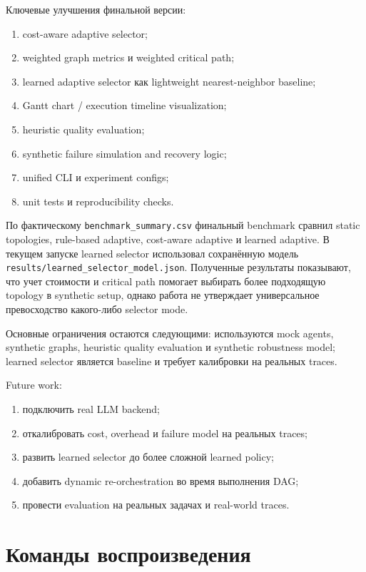 \documentclass[12pt,a4paper]{report}
\newcommand{\code}[1]{\texttt{#1}}
\begin{document}
Ключевые улучшения финальной версии:
\begin{enumerate}
  \item cost-aware adaptive selector;
  \item weighted graph metrics и weighted critical path;
  \item learned adaptive selector как lightweight nearest-neighbor baseline;
  \item Gantt chart / execution timeline visualization;
  \item heuristic quality evaluation;
  \item synthetic failure simulation and recovery logic;
  \item unified CLI и experiment configs;
  \item unit tests и reproducibility checks.
\end{enumerate}

По фактическому \code{benchmark\_summary.csv} финальный benchmark сравнил static topologies, rule-based adaptive, cost-aware adaptive и learned adaptive. В текущем запуске learned selector использовал сохранённую модель \code{results/learned\_selector\_model.json}. Полученные результаты показывают, что учет стоимости и critical path помогает выбирать более подходящую topology в synthetic setup, однако работа не утверждает универсальное превосходство какого-либо selector mode.

Основные ограничения остаются следующими: используются mock agents, synthetic graphs, heuristic quality evaluation и synthetic robustness model; learned selector является baseline и требует калибровки на реальных traces.

Future work:
\begin{enumerate}
  \item подключить real LLM backend;
  \item откалибровать cost, overhead и failure model на реальных traces;
  \item развить learned selector до более сложной learned policy;
  \item добавить dynamic re-orchestration во время выполнения DAG;
  \item провести evaluation на реальных задачах и real-world traces.
\end{enumerate}

\appendix
\chapter{Команды воспроизведения}
\end{document}
